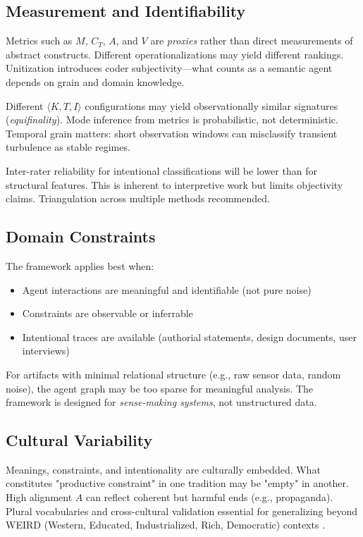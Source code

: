 \documentclass[12pt]{article}
\begin{document}
\subsection{Measurement and Identifiability}

Metrics such as $M$, $C_T$, $A$, and $V$ are \textit{proxies} rather than direct measurements of abstract constructs. Different operationalizations may yield different rankings. Unitization introduces coder subjectivity—what counts as a semantic agent depends on grain and domain knowledge.

Different $\langle K, T, I \rangle$ configurations may yield observationally similar signatures (\textit{equifinality}). Mode inference from metrics is probabilistic, not deterministic. Temporal grain matters: short observation windows can misclassify transient turbulence as stable regimes.

Inter-rater reliability for intentional classifications will be lower than for structural features. This is inherent to interpretive work but limits objectivity claims. Triangulation across multiple methods recommended.

\subsection{Domain Constraints}

The framework applies best when:
\begin{itemize}
\item Agent interactions are meaningful and identifiable (not pure noise)
\item Constraints are observable or inferrable
\item Intentional traces are available (authorial statements, design documents, user interviews)
\end{itemize}

For artifacts with minimal relational structure (e.g., raw sensor data, random noise), the agent graph may be too sparse for meaningful analysis. The framework is designed for \textit{sense-making systems}, not unstructured data.

\subsection{Cultural Variability}

Meanings, constraints, and intentionality are culturally embedded. What constitutes "productive constraint" in one tradition may be "empty" in another. High alignment $A$ can reflect coherent but harmful ends (e.g., propaganda). Plural vocabularies and cross-cultural validation essential for generalizing beyond WEIRD (Western, Educated, Industrialized, Rich, Democratic) contexts \citep{henrich2010weirdest}.
\end{document}
